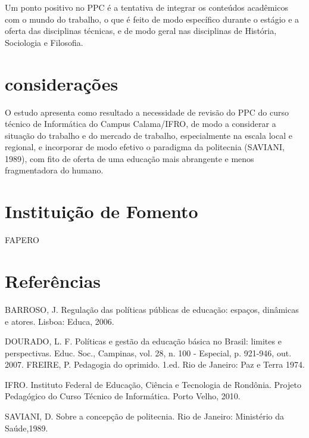 \documentclass[article,12pt,onesidea,4paper,english,brazil]{abntex2}
\begin{document}
Um ponto positivo no PPC é a tentativa de integrar os conteúdos acadêmicos com o mundo do trabalho, o que é feito de modo específico durante o estágio e a oferta das disciplinas técnicas, e de modo geral nas disciplinas de História, Sociologia e Filosofia.
	\section*{considerações}
	
	O estudo apresenta como resultado a necessidade de revisão do PPC do curso técnico de Informática do Campus Calama/IFRO, de modo a considerar a situação do trabalho e do mercado de trabalho, especialmente na escala local e regional, e incorporar de modo efetivo o paradigma da politecnia (SAVIANI, 1989), com fito de oferta de uma educação mais abrangente e menos fragmentadora do humano.
	\section*{Instituição de Fomento}
	
	FAPERO
	
	
	
	\section*{Referências}
	
	\noindent BARROSO, J. Regulação das políticas públicas de educação: espaços, dinâmicas e atores. Lisboa: Educa, 2006.
	
	\noindent DOURADO, L. F. Políticas e gestão da educação básica no Brasil: limites e perspectivas. Educ. Soc., Campinas, vol. 28, n. 100 - Especial, p. 921-946, out. 2007.
	FREIRE, P. Pedagogia do oprimido. 1.ed. Rio de Janeiro: Paz e Terra 1974.
	
	\noindent IFRO. Instituto Federal de Educação, Ciência e Tecnologia de Rondônia. Projeto Pedagógico do Curso Técnico de Informática. Porto Velho, 2010.
	
	\noindent SAVIANI, D. Sobre a concepção de politecnia. Rio de Janeiro: Ministério da Saúde,1989.
	
	
	
	
\end{document}
